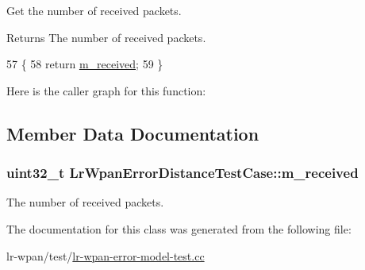 Get the number of received packets. 

\begin{DoxyReturn}{Returns}
The number of received packets. 
\end{DoxyReturn}

\begin{DoxyCode}
57   \{
58     \textcolor{keywordflow}{return} \hyperlink{classLrWpanErrorDistanceTestCase_a771226176fd530cfac26cbc016405f93}{m\_received};
59   \}
\end{DoxyCode}


Here is the caller graph for this function\+:




\subsection{Member Data Documentation}
\subsubsection[{\texorpdfstring{m\+\_\+received}{m_received}}]{\setlength{\rightskip}{0pt plus 5cm}uint32\+\_\+t Lr\+Wpan\+Error\+Distance\+Test\+Case\+::m\+\_\+received\hspace{0.3cm}{\ttfamily [private]}}\hypertarget{classLrWpanErrorDistanceTestCase_a771226176fd530cfac26cbc016405f93}{}\label{classLrWpanErrorDistanceTestCase_a771226176fd530cfac26cbc016405f93}


The number of received packets. 



The documentation for this class was generated from the following file\+:\begin{DoxyCompactItemize}
\item 
lr-\/wpan/test/\hyperlink{lr-wpan-error-model-test_8cc}{lr-\/wpan-\/error-\/model-\/test.\+cc}\end{DoxyCompactItemize}
